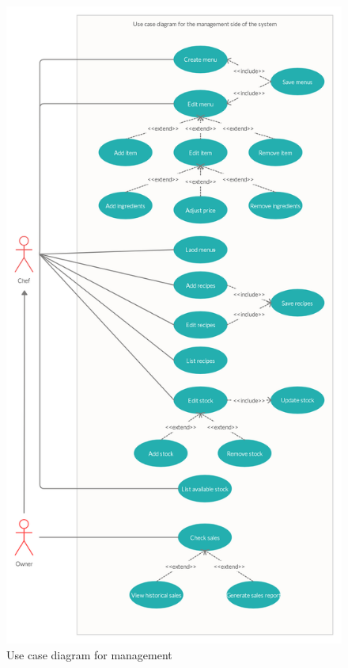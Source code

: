 \begin{figure}[H]
	\centering
	\includegraphics[width=135mm]{images/M_UCD.png}
	\caption{Use case diagram for management}
\end{figure}